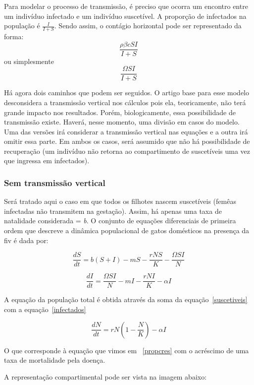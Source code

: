 \documentclass{article}
\begin{document}
\noindent Para modelar o processo de transmissão, é preciso que ocorra um encontro entre um indivíduo infectado e um indivíduo suscetível. A proporção de infectados na população é $\frac{I}{I+S}$. Sendo assim, o contágio horizontal pode ser representado da forma:
$$\frac{\rho \beta cSI}{I+S}$$
ou simplesmente 
$$\frac{\Omega SI}{I+S}$$

\noindent Há agora dois caminhos que podem ser seguidos. O artigo base para esse modelo desconsidera a transmissão vertical nos cálculos pois ela, teoricamente, não terá grande impacto nos resultados. Porém, biologicamente, essa possibilidade de transmissão existe. Haverá, nesse momento, uma divisão em casos do modelo. Uma das versões irá considerar a transmissão vertical nas equações e a outra irá omitir essa parte. Em ambos os casos, será assumido que não há possibilidade de recuperação (um indivíduo não retorna ao compartimento de suscetíveis uma vez que ingressa em infectados).

\subsubsection{Sem transmissão vertical}
Será tratado aqui o caso em que todos os filhotes nascem suscetíveis (femêas infectadas não transmitem na gestação). Assim, há apenas uma taxa de natalidade considerada = {\it b}. O conjunto de equações diferenciais de primeira ordem
que descreve a dinâmica populacional de gatos domésticos na presença da \gls{fiv} é dada por:

\begin{equation} \label{suscetiveis}
 \frac{dS}{dt}=b(S + I) - mS - \frac{rNS}{K} - \frac{\Omega SI}{N}
\end{equation}

\begin{equation} \label{infectados}
 \frac{dI}{dt}=  \frac{\Omega SI}{N} - mI - \frac{rNI}{K} - \alpha I
\end{equation}

A equação da população total é obtida através da soma da equação~\ref{suscetiveis} com a equação~\ref{infectados}

\begin{equation} \label{poptotal}
\frac{dN}{dt} = rN\left( 1-\frac{N}{K} \right) - \alpha I
\end{equation}

O que corresponde à equação que vimos em ~\ref{propcres} com o acréscimo de uma taxa de mortalidade pela doença.

A representação compartimental pode ser vista na imagem abaixo:
\end{document}
